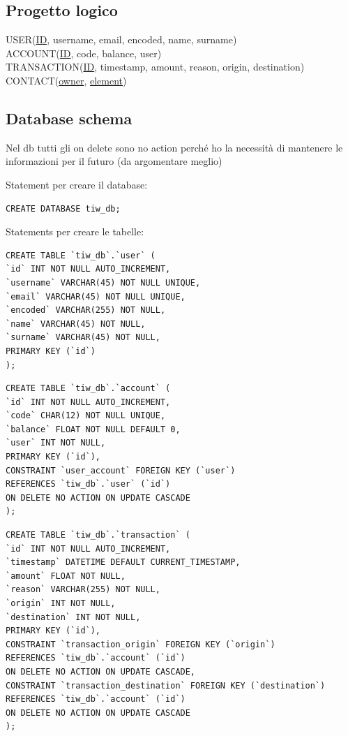 \documentclass{article}
\begin{document}
\subsection{Progetto logico}
USER(\underline{ID}, username, email, encoded, name, surname)
\\
ACCOUNT(\underline{ID}, code, balance, user)
\\
TRANSACTION(\underline{ID}, timestamp, amount, reason, origin, destination)
\\
CONTACT(\underline{owner}, \underline{element})

\subsection{Database schema}
Nel db tutti gli on delete sono no action perché ho la necessità di mantenere le informazioni per il futuro (da argomentare meglio)

Statement per creare il database:
\begin{verbatim}
CREATE DATABASE tiw_db;
\end{verbatim}

Statements per creare le tabelle: 
\begin{verbatim}
CREATE TABLE `tiw_db`.`user` (
`id` INT NOT NULL AUTO_INCREMENT,
`username` VARCHAR(45) NOT NULL UNIQUE,
`email` VARCHAR(45) NOT NULL UNIQUE,
`encoded` VARCHAR(255) NOT NULL,
`name` VARCHAR(45) NOT NULL,
`surname` VARCHAR(45) NOT NULL,
PRIMARY KEY (`id`)
);
\end{verbatim}

\begin{verbatim}
CREATE TABLE `tiw_db`.`account` (
`id` INT NOT NULL AUTO_INCREMENT,
`code` CHAR(12) NOT NULL UNIQUE,
`balance` FLOAT NOT NULL DEFAULT 0,
`user` INT NOT NULL,
PRIMARY KEY (`id`),
CONSTRAINT `user_account` FOREIGN KEY (`user`) 
REFERENCES `tiw_db`.`user` (`id`) 
ON DELETE NO ACTION ON UPDATE CASCADE
);
\end{verbatim}

\begin{verbatim}
CREATE TABLE `tiw_db`.`transaction` (
`id` INT NOT NULL AUTO_INCREMENT,
`timestamp` DATETIME DEFAULT CURRENT_TIMESTAMP,
`amount` FLOAT NOT NULL,
`reason` VARCHAR(255) NOT NULL,
`origin` INT NOT NULL,
`destination` INT NOT NULL,
PRIMARY KEY (`id`),
CONSTRAINT `transaction_origin` FOREIGN KEY (`origin`) 
REFERENCES `tiw_db`.`account` (`id`)
ON DELETE NO ACTION ON UPDATE CASCADE,
CONSTRAINT `transaction_destination` FOREIGN KEY (`destination`) 
REFERENCES `tiw_db`.`account` (`id`) 
ON DELETE NO ACTION ON UPDATE CASCADE
);
\end{verbatim}
\pagebreak
\end{document}
